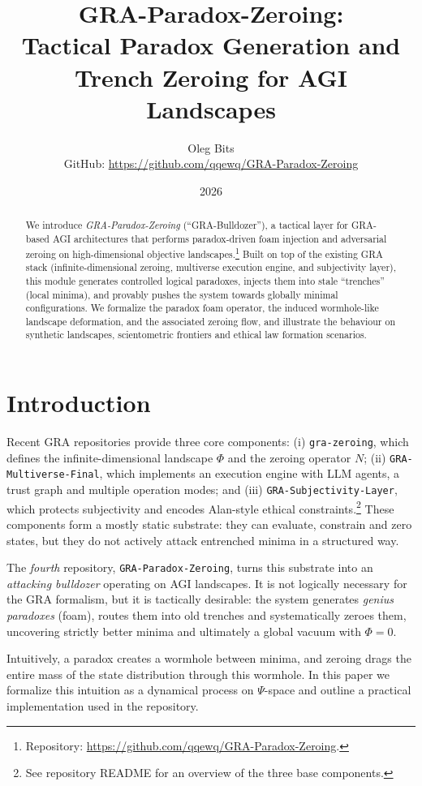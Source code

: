 \documentclass[11pt]{article}
\title{GRA-Paradox-Zeroing:\\
Tactical Paradox Generation and Trench Zeroing for AGI Landscapes}
\author{Oleg Bits\\
\small GitHub: \url{https://github.com/qqewq/GRA-Paradox-Zeroing}}
\date{2026}
\begin{document}
\maketitle

\begin{abstract}
We introduce \emph{GRA-Paradox-Zeroing} (``GRA-Bulldozer''), a tactical layer for GRA-based AGI architectures that performs paradox-driven foam injection and adversarial zeroing on high-dimensional objective landscapes.\footnote{Repository: \url{https://github.com/qqewq/GRA-Paradox-Zeroing}.} 
Built on top of the existing GRA stack (infinite-dimensional zeroing, multiverse execution engine, and subjectivity layer), this module generates controlled logical paradoxes, injects them into stale ``trenches'' (local minima), and provably pushes the system towards globally minimal configurations. 
We formalize the paradox foam operator, the induced wormhole-like landscape deformation, and the associated zeroing flow, and illustrate the behaviour on synthetic landscapes, scientometric frontiers and ethical law formation scenarios.
\end{abstract}

\section{Introduction}

Recent GRA repositories provide three core components: (i) \texttt{gra-zeroing}, which defines the infinite-dimensional landscape $\Phi$ and the zeroing operator $N$; (ii) \texttt{GRA-Multiverse-Final}, which implements an execution engine with LLM agents, a trust graph and multiple operation modes; and (iii) \texttt{GRA-Subjectivity-Layer}, which protects subjectivity and encodes Alan-style ethical constraints.\footnote{See repository README for an overview of the three base components.} 
These components form a mostly static substrate: they can evaluate, constrain and zero states, but they do not actively attack entrenched minima in a structured way. 

The \emph{fourth} repository, \texttt{GRA-Paradox-Zeroing}, turns this substrate into an \emph{attacking bulldozer} operating on AGI landscapes. 
It is not logically necessary for the GRA formalism, but it is tactically desirable: the system generates \emph{genius paradoxes} (foam), routes them into old trenches and systematically zeroes them, uncovering strictly better minima and ultimately a global vacuum with $\Phi = 0$. 

Intuitively, a paradox creates a wormhole between minima, and zeroing drags the entire mass of the state distribution through this wormhole. 
In this paper we formalize this intuition as a dynamical process on $\Psi$-space and outline a practical implementation used in the repository.
\end{document}
